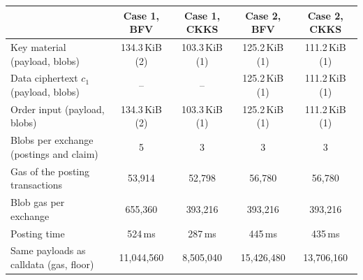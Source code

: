 \begin{tabular}{lcccc}
\toprule
 & Case 1, BFV & Case 1, CKKS & Case 2, BFV & Case 2, CKKS \\
\midrule
Key material (payload, blobs) & 134.3\,KiB (2) & 103.3\,KiB (1) & 125.2\,KiB (1) & 111.2\,KiB (1) \\
Data ciphertext $c_1$ (payload, blobs) & -- & -- & 125.2\,KiB (1) & 111.2\,KiB (1) \\
Order input (payload, blobs) & 134.3\,KiB (2) & 103.3\,KiB (1) & 125.2\,KiB (1) & 111.2\,KiB (1) \\
Blobs per exchange (postings and claim) & 5 & 3 & 3 & 3 \\
Gas of the posting transactions & 53{,}914 & 52{,}798 & 56{,}780 & 56{,}780 \\
Blob gas per exchange & 655{,}360 & 393{,}216 & 393{,}216 & 393{,}216 \\
Posting time & 524\,ms & 287\,ms & 445\,ms & 435\,ms \\
Same payloads as calldata (gas, floor) & 11{,}044{,}560 & 8{,}505{,}040 & 15{,}426{,}480 & 13{,}706{,}160 \\
\bottomrule
\end{tabular}
